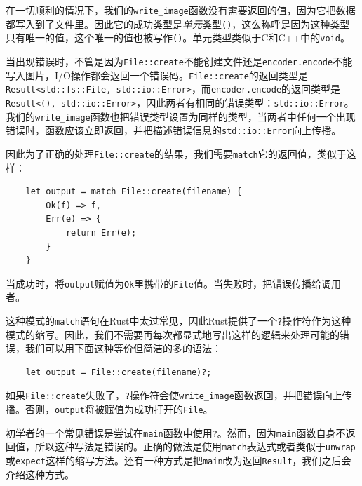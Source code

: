 在一切顺利的情况下，我们的\texttt{write\_image}函数没有需要返回的值，因为它把数据都写入到了文件里。因此它的成功类型是\emph{单元}类型\texttt{()}，这么称呼是因为这种类型只有唯一的值，这个唯一的值也被写作\texttt{()}。单元类型类似于C和C++中的\texttt{void}。

当出现错误时，不管是因为\texttt{File::create}不能创建文件还是\texttt{encoder.encode}不能写入图片，I/O操作都会返回一个错误码。\texttt{File::create}的返回类型是\texttt{Result<std::fs::File, std::io::Error>}，而\texttt{encoder.encode}的返回类型是\texttt{Result<(), std::io::Error>}，因此两者有相同的错误类型：\texttt{std::io::Error}。我们的\texttt{write\_image}函数也把错误类型设置为同样的类型，当两者中任何一个出现错误时，函数应该立即返回，并把描述错误信息的\texttt{std::io::Error}向上传播。

因此为了正确的处理\texttt{File::create}的结果，我们需要\texttt{match}它的返回值，类似于这样：
\begin{verbatim}
    let output = match File::create(filename) {
        Ok(f) => f,
        Err(e) => {
            return Err(e);
        }
    }
\end{verbatim}

当成功时，将\texttt{output}赋值为\texttt{Ok}里携带的\texttt{File}值。当失败时，把错误传播给调用者。

这种模式的\texttt{match}语句在Rust中太过常见，因此Rust提供了一个\texttt{?}操作符作为这种模式的缩写。因此，我们不需要再每次都显式地写出这样的逻辑来处理可能的错误，我们可以用下面这种等价但简洁的多的语法：
\begin{verbatim}
    let output = File::create(filename)?;
\end{verbatim}

如果\texttt{File::create}失败了，\texttt{?}操作符会使\texttt{write\_image}函数返回，并把错误向上传播。否则，\texttt{output}将被赋值为成功打开的\texttt{File}。

\begin{note}
    初学者的一个常见错误是尝试在\texttt{main}函数中使用\texttt{?}。然而，因为\texttt{main}函数自身不返回值，所以这种写法是错误的。正确的做法是使用\texttt{match}表达式或者类似于\texttt{unwrap}或\texttt{expect}这样的缩写方法。还有一种方式是把\texttt{main}改为返回\texttt{Result}，我们之后会介绍这种方式。
\end{note}

